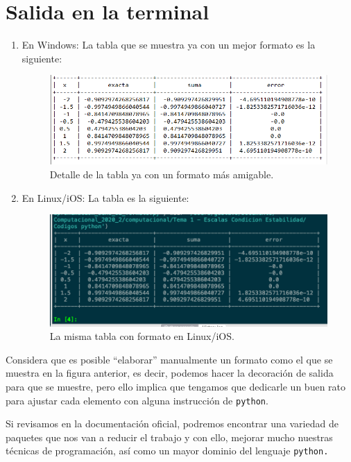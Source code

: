 \documentclass[11pt]{article}
\newcommand{\letraconsola}[1]{\texttt{#1}}
\begin{document}
\section{Salida en la terminal}
\begin{enumerate}
\item En Windows: La tabla que se muestra ya con un mejor formato es la siguiente:
\begin{figure}[H]
    \centering
    \includegraphics[scale=0.8]{Imagenes/instalacion_paquete_python_04.png}
    \caption{Detalle de la tabla ya con un formato más amigable.}
    \label{fig:figura_04}
\end{figure}
\item En Linux/iOS: La tabla es la siguiente:
\begin{figure}[H]
    \centering
    \includegraphics[scale=0.4]{Imagenes/instalacion_paquete_python_08.png}
    \caption{La misma tabla con formato en Linux/iOS.}
    \label{fig:figura_08}
\end{figure}
\end{enumerate}
Considera que es posible \enquote{elaborar} manualmente un formato como el que se muestra en la figura anterior, es decir, podemos hacer la decoración de salida para que se muestre, pero ello implica que tengamos que dedicarle un buen rato para ajustar cada elemento con alguna instrucción de \letraconsola{python}.
\par
Si revisamos en la documentación oficial, podremos encontrar una variedad de paquetes que nos van a reducir el trabajo y con ello, mejorar mucho nuestras técnicas de programación, así como un mayor dominio del lenguaje \letraconsola{python.}
\end{document}
